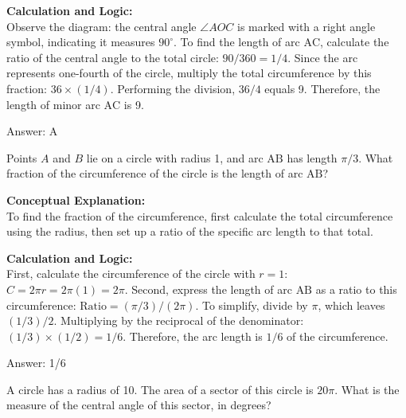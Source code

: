 \documentclass[11pt,paper=a4,answers]{exam}
\begin{document}
\begin{questions}
\begin{solution}
\vspace{30pt}

\textbf{Calculation and Logic:} \\
Observe the diagram: the central angle $\angle AOC$ is marked with a right angle symbol, indicating it measures $90^\circ$. To find the length of arc $\text{AC}$, calculate the ratio of the central angle to the total circle: $90 / 360 = 1 / 4$. Since the arc represents one-fourth of the circle, multiply the total circumference by this fraction: $36 \times (1/4)$. Performing the division, $36 / 4$ equals 9. Therefore, the length of minor arc $\text{AC}$ is 9.

\vspace{30pt}

Answer: \colorbox{yellow!100}{A}
\end{solution}

\vspace{60pt}

\question
Points $A$ and $B$ lie on a circle with radius 1, and arc $\text{AB}$ has length $\pi / 3$. What fraction of the circumference of the circle is the length of arc $\text{AB}$?

\begin{solution}
\textbf{Conceptual Explanation:} \\
To find the fraction of the circumference, first calculate the total circumference using the radius, then set up a ratio of the specific arc length to that total.

\vspace{30pt}

\textbf{Calculation and Logic:} \\
First, calculate the circumference of the circle with $r = 1$: $C = 2\pi r = 2\pi(1) = 2\pi$. Second, express the length of arc $\text{AB}$ as a ratio to this circumference: $\text{Ratio} = (\pi / 3) / (2\pi)$. To simplify, divide by $\pi$, which leaves $(1/3) / 2$. Multiplying by the reciprocal of the denominator: $(1/3) \times (1/2) = 1/6$. Therefore, the arc length is $1/6$ of the circumference.

\vspace{30pt}

Answer: \colorbox{yellow!100}{1/6}
\end{solution}

\vspace{60pt}

\question
A circle has a radius of 10. The area of a sector of this circle is $20\pi$. What is the measure of the central angle of this sector, in degrees?


\end{questions}
\end{document}
